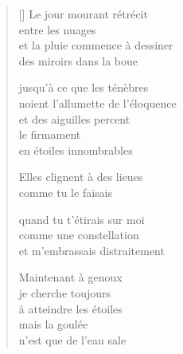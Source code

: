 \documentclass[12pt,a4paper]{article}
\begin{document}
\begin{verse}[\versewidth]
  Le jour mourant rétrécit \\
  entre les nuages \\
  et la pluie commence à dessiner \\
  des miroirs dans la boue

  jusqu'à ce que les ténèbres \\
  noient l'allumette de l'éloquence \\
  et des aiguilles percent \\
  le firmament \\
  en étoiles innombrables

  Elles clignent à des lieues \\
  comme tu le faisais

  quand tu t'étirais sur moi \\
  comme une constellation \\
  et m'embrassais distraitement

  Maintenant à genoux \\
  je cherche toujours \\
  à atteindre les étoiles \\
  mais la goulée \\
  n'est que de l'eau sale
\end{verse}


\newpage

\poemtitle{}

\settowidth{\versewidth}{qui sondent silencieusement ta nuit}

\bigskip
\end{document}
